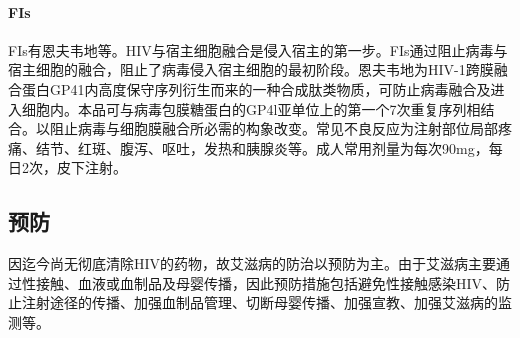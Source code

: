 \paragraph{FIs}

FIs有恩夫韦地等。HIV与宿主细胞融合是侵入宿主的第一步。FIs通过阻止病毒与宿主细胞的融合，阻止了病毒侵入宿主细胞的最初阶段。恩夫韦地为HIV-1跨膜融合蛋白GP41内高度保守序列衍生而来的一种合成肽类物质，可防止病毒融合及进入细胞内。本品可与病毒包膜糖蛋白的GP4l亚单位上的第一个7次重复序列相结合。以阻止病毒与细胞膜融合所必需的构象改变。常见不良反应为注射部位局部疼痛、结节、红斑、腹泻、呕吐，发热和胰腺炎等。成人常用剂量为每次90mg，每日2次，皮下注射。

\subsection{预防}

因迄今尚无彻底清除HIV的药物，故艾滋病的防治以预防为主。由于艾滋病主要通过性接触、血液或血制品及母婴传播，因此预防措施包括避免性接触感染HIV、防止注射途径的传播、加强血制品管理、切断母婴传播、加强宣教、加强艾滋病的监测等。